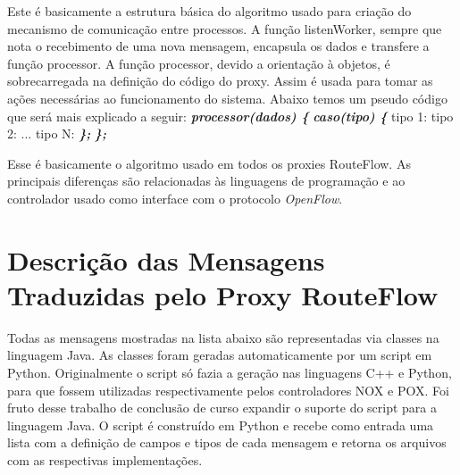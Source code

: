 Este é basicamente a estrutura básica do algoritmo usado
para criação do mecanismo de comunicação entre processos.
A função listenWorker, sempre que nota o recebimento de
uma nova mensagem, encapsula os dados e transfere a função 
processor. A função processor, devido a orientação à objetos,
é sobrecarregada na definição do código do proxy. Assim é usada
para tomar as ações necessárias ao funcionamento do sistema.
Abaixo temos um pseudo código que será mais explicado a seguir:
\newline
\newline
\noindent
{}
\newline
\textit{\textbf{processor(dados) \{}}
\newline
\newline
\indent
{}
\newline
\indent
\textit{\textbf{caso(tipo) \{}}
\newline
\indent
\indent
tipo 1: 
\newline
\indent
\indent
tipo 2: 
\newline
\indent
\indent
...
\newline
\indent
\indent
tipo N: 
\newline
\indent
\textit{\textbf{\};}}
\newline
\textit{\textbf{\};}}
\newline

Esse é basicamente o algoritmo usado em todos os proxies RouteFlow.
As principais diferenças são relacionadas às linguagens de programação
 e ao controlador usado como interface com o protocolo
\textit{OpenFlow}.

\section{Descrição das Mensagens Traduzidas pelo Proxy RouteFlow}

Todas as mensagens mostradas na lista abaixo são representadas
via classes na linguagem Java. As classes foram geradas
automaticamente por um script em Python. Originalmente
o script só fazia a geração nas linguagens C++ e Python,
para que fossem utilizadas respectivamente pelos controladores
NOX e POX. Foi fruto desse trabalho de conclusão de curso
expandir o suporte do script para a linguagem Java. O script
é construído em Python e recebe como entrada uma lista com
a definição de campos e tipos de cada mensagem e retorna
os arquivos com as respectivas implementações. 

